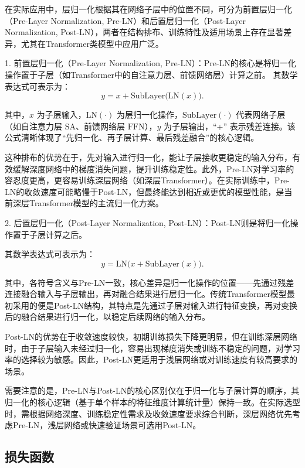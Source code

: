 在实际应用中，层归一化根据其在网络子层中的位置不同，可分为前置层归一化（Pre-Layer Normalization, Pre-LN）和后置层归一化（Post-Layer Normalization, Post-LN），两者在结构排布、训练特性及适用场景上存在显著差异，尤其在Transformer类模型中应用广泛。

1.  前置层归一化（Pre-Layer Normalization, Pre-LN）：Pre-LN的核心是将归一化操作置于子层（如Transformer中的自注意力层、前馈网络层）计算之前。
其数学表达式可表示为：
\begin{equation}
    y = x + \text{SubLayer}\bigl(\text{LN}(x)\bigr).
\end{equation}

其中，$x$ 为子层输入，$\text{LN}(\cdot)$ 为层归一化操作，$\text{SubLayer}(\cdot)$ 代表网络子层（如自注意力层 $\text{SA}$、前馈网络层 $\text{FFN}$），$y$ 为子层输出，“+” 表示残差连接。该公式清晰体现了“先归一化、再子层计算、最后残差融合”的核心逻辑。

这种排布的优势在于，先对输入进行归一化，能让子层接收更稳定的输入分布，有效缓解深度网络中的梯度消失问题，提升训练稳定性。此外，Pre-LN对学习率的容忍度更高，更容易训练深层网络（如深层Transformer）。在实际训练中，Pre-LN的收敛速度可能略慢于Post-LN，但最终能达到相近或更优的模型性能，是当前深层Transformer模型的主流归一化方案。

2.  后置层归一化（Post-Layer Normalization, Post-LN）：Post-LN则是将归一化操作置于子层计算之后。

其数学表达式可表示为：
\begin{equation}
    y = \text{LN}\bigl(x + \text{SubLayer}(x)\bigr).
\end{equation}

其中，各符号含义与Pre-LN一致，核心差异是归一化操作的位置——先通过残差连接融合输入与子层输出，再对融合结果进行层归一化。传统Transformer模型最初采用的便是Post-LN结构，其特点是先通过子层对输入进行特征变换，再对变换后的融合结果进行归一化，以稳定后续网络的输入分布。

Post-LN的优势在于收敛速度较快，初期训练损失下降更明显，但在训练深层网络时，由于子层输入未经过归一化，容易出现梯度消失或训练不稳定的问题，对学习率的选择较为敏感。因此，Post-LN更适用于浅层网络或对训练速度有较高要求的场景。

需要注意的是，Pre-LN与Post-LN的核心区别仅在于归一化与子层计算的顺序，其归一化的核心逻辑（基于单个样本的特征维度计算统计量）保持一致。在实际选型时，需根据网络深度、训练稳定性需求及收敛速度要求综合判断，深层网络优先考虑Pre-LN，浅层网络或快速验证场景可选用Post-LN。

\subsection{损失函数}

